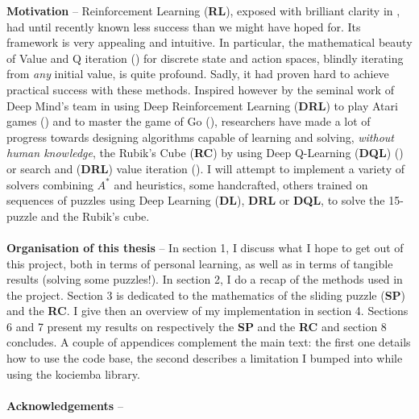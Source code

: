 
\label{Abstract}
\noindent \textbf{Motivation} -- Reinforcement Learning (\textbf{RL}), exposed with brilliant clarity in \cite{Sutton1998}, had until recently known less success than we might have hoped for. Its framework is very appealing and intuitive. In particular, the mathematical beauty of Value and Q iteration (\cite{WatkinsThesis}) for discrete state and action spaces, blindly iterating from \textit{any} initial value, is quite profound. Sadly, it had proven hard to achieve practical success with these methods. Inspired however by the seminal work of Deep Mind's team in using Deep Reinforcement Learning (\textbf{DRL}) to play Atari games (\cite{Mnih2013})  and to master the game of Go (\cite{AlphaGo}), researchers have made a lot of progress towards designing algorithms capable of learning and solving, \textit{without human knowledge}, the Rubik's Cube (\textbf{RC}) by using Deep Q-Learning (\textbf{DQL})  (\cite{DBLP:journals/corr/abs-1805-07470}) or search and (\textbf{DRL}) value iteration (\cite{https://doi.org/10.48550/arxiv.1805.07470}). I will attempt to implement a variety of solvers combining $A^{*}$ and heuristics, some handcrafted, others trained on sequences of puzzles using Deep Learning (\textbf{DL}), \textbf{DRL} or \textbf{DQL}, to solve the 15-puzzle and the Rubik's cube.
\\
\\
\textbf{Organisation of this thesis} -- In section 1, I discuss what I hope to get out of this project, both in terms of personal learning, as well as in terms of tangible results (solving some puzzles!). In section 2, I do a recap of the methods used in the project. Section 3 is dedicated to the mathematics of the sliding puzzle (\textbf{SP}) and the \textbf{RC}. I give then an overview of my implementation in section 4. Sections 6 and 7 present my results on respectively the \textbf{SP} and the \textbf{RC} and section 8 concludes. A couple of appendices complement the main text: the first one details how to use the code base, the second describes a limitation I bumped into while using the kociemba library.
\\
\\
\noindent \textbf{Acknowledgements} -- 
